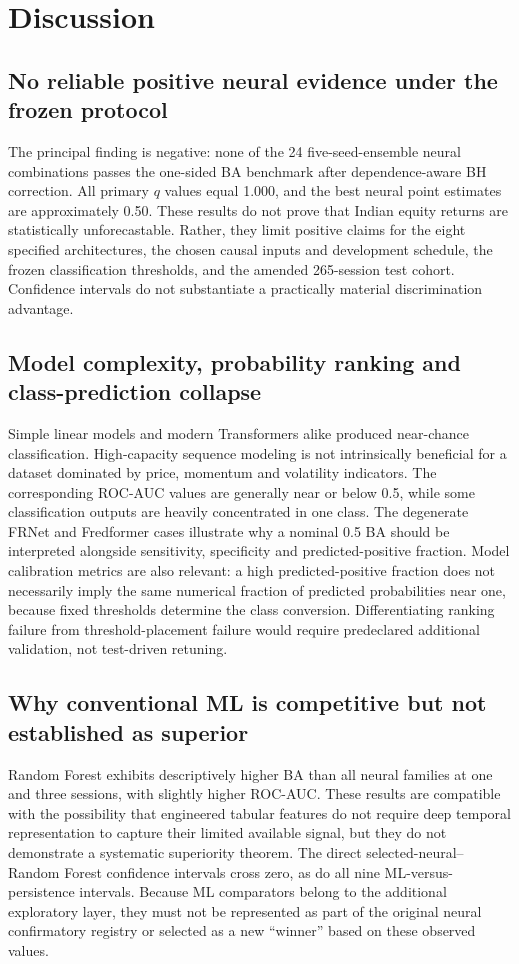 \documentclass[fleqn,10pt]{wlscirep}
\begin{document}
\FloatBarrier
\section{Discussion}\label{sec:discussion}
\subsection{No reliable positive neural evidence under the frozen protocol}
The principal finding is negative: none of the 24 five-seed-ensemble neural combinations passes the one-sided BA benchmark after dependence-aware BH correction. All primary $q$ values equal 1.000, and the best neural point estimates are approximately 0.50. These results do not prove that Indian equity returns are statistically unforecastable. Rather, they limit positive claims for the eight specified architectures, the chosen causal inputs and development schedule, the frozen classification thresholds, and the amended 265-session test cohort. Confidence intervals do not substantiate a practically material discrimination advantage.

\subsection{Model complexity, probability ranking and class-prediction collapse}
Simple linear models and modern Transformers alike produced near-chance classification. High-capacity sequence modeling is not intrinsically beneficial for a dataset dominated by price, momentum and volatility indicators. The corresponding ROC-AUC values are generally near or below 0.5, while some classification outputs are heavily concentrated in one class. The degenerate FRNet and Fredformer cases illustrate why a nominal 0.5 BA should be interpreted alongside sensitivity, specificity and predicted-positive fraction. Model calibration metrics are also relevant: a high predicted-positive fraction does not necessarily imply the same numerical fraction of predicted probabilities near one, because fixed thresholds determine the class conversion. Differentiating ranking failure from threshold-placement failure would require predeclared additional validation, not test-driven retuning.

\subsection{Why conventional ML is competitive but not established as superior}
Random Forest exhibits descriptively higher BA than all neural families at one and three sessions, with slightly higher ROC-AUC. These results are compatible with the possibility that engineered tabular features do not require deep temporal representation to capture their limited available signal, but they do not demonstrate a systematic superiority theorem. The direct selected-neural--Random Forest confidence intervals cross zero, as do all nine ML-versus-persistence intervals. Because ML comparators belong to the additional exploratory layer, they must not be represented as part of the original neural confirmatory registry or selected as a new ``winner'' based on these observed values.
\end{document}
